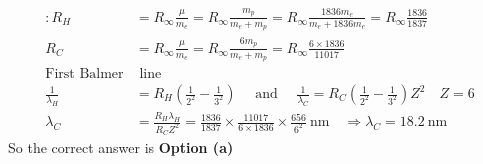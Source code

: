 \begin{enumerate}
\begin{answer}
	\begin{align*}
	: R_{H}&=R_{\infty} \frac{\mu}{m_{e}}=R_{\infty} \frac{m_{p}}{m_{e}+m_{p}}=R_{\infty} \frac{1836 m_{e}}{m_{e}+1836 m_{e}}=R_{\infty} \frac{1836}{1837}\\
	R_{C}&=R_{\infty} \frac{\mu}{m_{e}}=R_{\infty} \frac{6 m_{p}}{m_{e}+m_{p}}=R_{\infty} \frac{6 \times 1836}{11017}\\
	\text{First Balmer}&\text{ line}\\
	\frac{1}{\lambda_{H}}&=R_{H}\left(\frac{1}{2^{2}}-\frac{1}{3^{2}}\right) \quad \text { and } \quad \frac{1}{\lambda_{C}}=R_{C}\left(\frac{1}{2^{2}}-\frac{1}{3^{2}}\right) Z^{2} \quad Z=6 \\
	\lambda_{C}&=\frac{R_{H} \lambda_{H}}{R_{C} Z^{2}}=\frac{1836}{1837} \times \frac{11017}{6 \times 1836} \times \frac{656}{6^{2}} \mathrm{~nm} \quad \Rightarrow \lambda_{C}=18.2 \mathrm{~nm}
	\end{align*}
		So the correct answer is \textbf{Option (a)}
\end{answer}

\end{enumerate}

